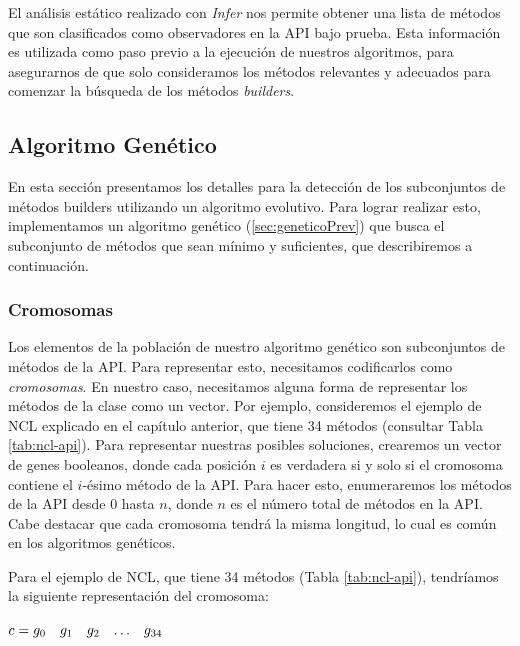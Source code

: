 El análisis estático realizado con \emph{Infer} nos permite obtener una lista de métodos que son clasificados como observadores en la API bajo prueba. Esta información es utilizada como paso previo a la ejecución de nuestros algoritmos, para asegurarnos de que solo consideramos los métodos relevantes y adecuados para comenzar la búsqueda de los métodos \emph{builders}.

\subsection{Algoritmo Genético}
\label{alg:approachGA}
En esta sección presentamos los detalles para la detección de los subconjuntos de métodos builders utilizando un algoritmo evolutivo. Para lograr realizar esto, implementamos un algoritmo genético (\ref{sec:geneticoPrev}) que busca el subconjunto de métodos que sean mínimo y suficientes, que describiremos a continuación.






\subsubsection{Cromosomas}
\label{ge:cromosomas}

Los elementos de la población de nuestro algoritmo genético son subconjuntos de métodos de la API. Para representar esto, necesitamos codificarlos como \emph{cromosomas}. En nuestro caso, necesitamos alguna forma de representar los métodos de la clase como un vector. Por ejemplo, consideremos el ejemplo de NCL explicado en el capítulo anterior, que tiene 34 métodos (consultar Tabla \ref{tab:ncl-api}). Para representar nuestras posibles soluciones, crearemos un vector de genes booleanos, donde cada posición $i$ es verdadera si y solo si el cromosoma contiene el $i$-ésimo método de la API. Para hacer esto, enumeraremos los métodos de la API desde 0 hasta $n$, donde $n$ es el número total de métodos en la API. Cabe destacar que cada cromosoma tendrá la misma longitud, lo cual es común en los algoritmos genéticos.

Para el ejemplo de NCL, que tiene 34 métodos (Tabla \ref{tab:ncl-api}), tendríamos la siguiente representación del cromosoma:

\begin{center}
$c = \begin{array}{@{}cccccc@{}}
\scriptsize g_0 & \scriptsize g_1 & \scriptsize g_2 & \ldots & \scriptsize g_{34}
\end{array}$
\end{center}

